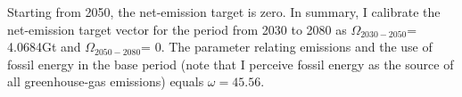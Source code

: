 Starting from 2050, the net-emission target is zero. In summary, I calibrate the net-emission target vector for the period from 2030 to 2080 as
$\Omega_{2030-2050}$= 4.0684Gt and $\Omega_{2050-2080}$= 0. The parameter relating emissions and the use of fossil energy in the base period (note that I perceive fossil energy as the source of all greenhouse-gas emissions) equals $\omega=45.56$.  

%
%
%


